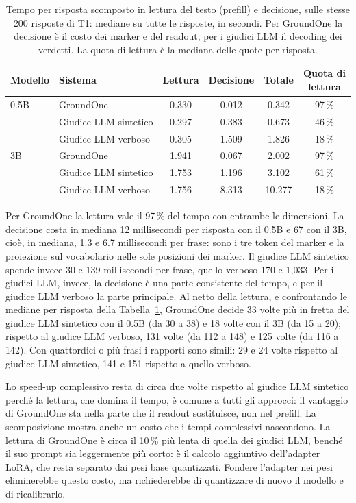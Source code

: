 \begin{table}[htbp]
\centering
\caption{Tempo per risposta scomposto in lettura del testo (prefill) e decisione, sulle stesse 200 risposte di T1:
mediane su tutte le risposte, in secondi. Per GroundOne la decisione è il costo dei marker e del readout, per i
giudici LLM il decoding dei verdetti. La quota di lettura è la mediana delle quote per risposta.}
\label{tab:results-latency-split}
\small
\begin{tabular}{llcccc}
\toprule
Modello & Sistema & Lettura & Decisione & Totale & \makecell{Quota di\\lettura} \\
\midrule
0.5B & GroundOne & 0.330 & 0.012 & 0.342 & 97\,\% \\
 & Giudice LLM sintetico & 0.297 & 0.383 & 0.673 & 46\,\% \\
 & Giudice LLM verboso & 0.305 & 1.509 & 1.826 & 18\,\% \\
\midrule
3B & GroundOne & 1.941 & 0.067 & 2.002 & 97\,\% \\
 & Giudice LLM sintetico & 1.753 & 1.196 & 3.102 & 61\,\% \\
 & Giudice LLM verboso & 1.756 & 8.313 & 10.277 & 18\,\% \\
\bottomrule
\end{tabular}
\end{table}

Per GroundOne la lettura vale il 97\,\% del tempo con entrambe le dimensioni. La decisione costa in mediana 12
millisecondi per risposta con il 0.5B e 67 con il 3B, cioè, in mediana, 1.3 e 6.7 millisecondi per frase: sono i tre token del
marker e la proiezione sul vocabolario nelle sole posizioni dei marker. Il giudice LLM sintetico spende invece 30 e 139
millisecondi per frase, quello verboso 170 e 1{,}033. Per i giudici LLM, invece, la decisione è una
parte consistente del tempo, e per il giudice LLM verboso la parte principale. Al netto della lettura, e confrontando le mediane per risposta della Tabella~\ref{tab:results-latency-split}, GroundOne decide 33 volte più in fretta del giudice LLM sintetico con il 0.5B (da 30 a 38) e 18 volte con il 3B (da 15 a 20); rispetto al
giudice LLM verboso, 131 volte (da 112 a 148) e 125 volte (da 116 a 142). Con quattordici o più frasi i rapporti sono
simili: 29 e 24 volte rispetto al giudice LLM sintetico, 141 e 151 rispetto a quello verboso.

Lo speed-up complessivo resta di circa due volte rispetto al giudice LLM sintetico perché la lettura, che domina il tempo,
è comune a tutti gli approcci: il vantaggio di GroundOne sta nella parte che il readout sostituisce, non nel prefill.
La scomposizione mostra anche un costo che i tempi complessivi nascondono. La lettura di GroundOne è circa il 10\,\%
più lenta di quella dei giudici LLM, benché il suo prompt sia leggermente più corto: è il calcolo aggiuntivo
dell'adapter LoRA, che resta separato dai pesi base quantizzati. Fondere l'adapter nei pesi eliminerebbe questo costo,
ma richiederebbe di quantizzare di nuovo il modello e di ricalibrarlo.


